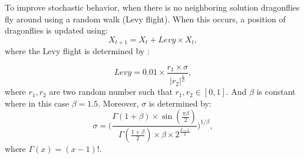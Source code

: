To improve stochastic behavior, when there is no neighboring solution dragonflies fly around using a random walk (Levy flight). When this occurs, a position of dragonflies is updated using:
\begin{equation}
\label{dskimsegawon}
X_{t+1}= X_t + Levy \times X_t,
\end{equation}
where the Levy flight is determined by \cite{Omid}:

\begin{equation}
Levy = 0.01 \times \frac{r_1 \times \sigma}{|r_2|^{\frac{1}{\beta}}},
\end{equation}
where $r_1, r_2$ are two random number such that $r_1, r_2 \in [0,1]$. And $\beta$ is constant where in this case $\beta = 1.5$. Moreover, $\sigma$ is determined by:
\begin{equation}
\sigma = \Bigg(\frac{\Gamma (1+\beta)\times \sin (\frac{\pi \beta}{2})}{\Gamma (\frac{1+\beta}{2})\times \beta \times 2^{\frac{\beta-1}{2}}}\Bigg)^{1/\beta},
\end{equation} 
where $\Gamma(x)=(x-1)!$.